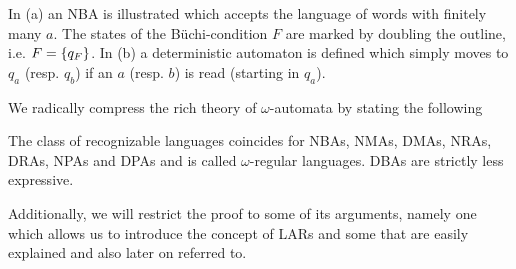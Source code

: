 \begin{drawing}
  \caption{In (a) an \ac{NBA} is illustrated which accepts the language of
  words with finitely many $a$. The states of the Büchi-condition $F$ are
  marked by doubling the outline, i.e. $F = \left\{q_{F}\right\}$.
  In (b) a deterministic automaton is defined which simply moves to $q_{a}$
  (resp. $q_{b}$) if an $a$ (resp. $b$) is read (starting in $q_{a}$).}
  \label{fig:finaautomata}
\end{drawing}
We radically compress the rich theory of $\omega$-automata by stating the 
following
\begin{theorem}
  \cite[Theorem 1.19, Theorem 1.24, Section 1.3.2,Theorem 3.2]{AutoLogInfGames}
  The class of recognizable languages coincides for \acp{NBA}, \acp{NMA},
  \acp{DMA}, \acp{NRA}, \acp{DRA}, \acp{NPA} and \acp{DPA} and is called
  $\omega$-regular languages. \acp{DBA} are strictly less expressive.
  \label{thm:omegaregularexp}
\end{theorem}
Additionally, we will restrict the proof to some of its arguments, namely one
which allows us to introduce the concept of \acp{LAR} and some that are easily
explained and also later on referred to.
